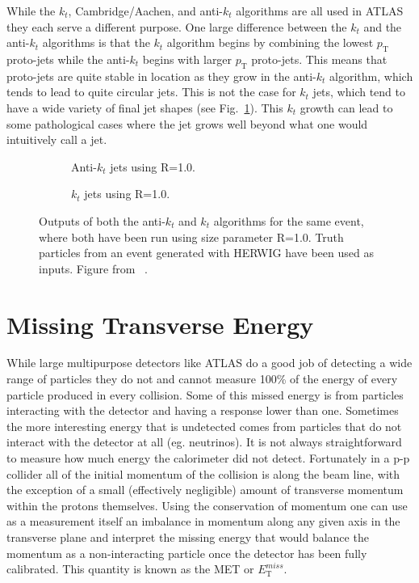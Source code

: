 While the $k_t$, Cambridge/Aachen, and anti-$k_t$ algorithms are all used in ATLAS they each serve a different purpose. 
One large difference between the $k_t$ and the anti-$k_t$ algorithms is that the $k_t$ algorithm begins by combining the lowest $p_{\mathrm T}$ proto-jets while the anti-$k_t$ begins with larger $p_{\mathrm T}$ proto-jets.  
This means that proto-jets are quite stable in location as they grow in the anti-$k_t$ algorithm, which tends to lead to quite circular jets.  
This is not the case for $k_t$ jets, which tend to have a wide variety of final jet shapes (see Fig.~\ref{Fig:ExampleJets}).  
This $k_t$ growth can lead to some pathological cases where the jet grows well beyond what one would intuitively call a jet.  

\begin{figure}[!ht]
 \centering
 \begin{subfigure}{.5\textwidth}
  \centering
  \caption{Anti-$k_t$ jets using R=1.0.}
 \end{subfigure}%
 \begin{subfigure}{.5\textwidth}
  \centering
  \caption{$k_t$ jets using R=1.0.}
 \end{subfigure}
 \caption[Comparing differnet jet building algorithms.]
  {Outputs of both the anti-$k_t$ and $k_t$ algorithms for the same event, where both have been run using size parameter R=1.0.  Truth particles from an event generated with HERWIG have been used as inputs.  Figure from ~\cite{Cacciari:2008gp}. }
 \label{Fig:ExampleJets}
\end{figure}



\section{Missing Transverse Energy}
\label{Sec:MET}
While large multipurpose detectors like ATLAS do a good job of detecting a wide range of particles they do not and cannot measure 100\% of the energy of every particle produced in every collision.  
Some of this missed energy is from particles interacting with the detector and having a response lower than one.  
Sometimes the more interesting energy that is undetected comes from particles that do not interact with the detector at all (eg. neutrinos).  
It is not always straightforward to measure how much energy the calorimeter did not detect.  
Fortunately in a p-p collider all of the initial momentum of the collision is along the beam line, with the exception of a small (effectively negligible) amount of transverse momentum within the protons themselves.  
Using the conservation of momentum one can use as a measurement itself an imbalance in momentum along any given axis in the transverse plane and interpret the missing energy that would balance the momentum as a non-interacting particle once the detector has been fully calibrated.  
This quantity is known as the \gls{MET} or $E_{\mathrm T}^{miss}$.  


